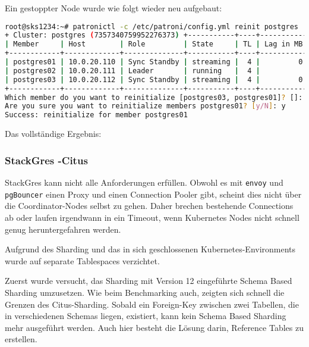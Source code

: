 \begin{flushleft}
\begin{lstlisting}[language=bash, caption=Patroni - Testing - Switchover,captionpos=b,label={lst:testing_patroni_switchover},breaklines=true]
\end{lstlisting}
    Ein gestoppter Node wurde wie folgt wieder neu aufgebaut:
\lstset{style=gra_codestyle}
\begin{lstlisting}[language=bash, caption=Patroni - Testing - Reinit,captionpos=b,label={lst:testing_patroni_reinit},breaklines=true]
root@sks1234:~# patronictl -c /etc/patroni/config.yml reinit postgres
+ Cluster: postgres (7357340759952276373) +-----------+----+-----------+
| Member     | Host        | Role         | State     | TL | Lag in MB |
+------------+-------------+--------------+-----------+----+-----------+
| postgres01 | 10.0.20.110 | Sync Standby | streaming |  4 |         0 |
| postgres02 | 10.0.20.111 | Leader       | running   |  4 |           |
| postgres03 | 10.0.20.112 | Sync Standby | streaming |  4 |         0 |
+------------+-------------+--------------+-----------+----+-----------+
Which member do you want to reinitialize [postgres03, postgres01]? []: postgres01
Are you sure you want to reinitialize members postgres01? [y/N]: y
Success: reinitialize for member postgres01
\end{lstlisting}
\end{flushleft}
\clearpage
{}
\recalctypearea
\begin{flushleft}
    Das vollständige Ergebnis:
    
\end{flushleft}
\clearpage
{}
\recalctypearea
\begin{flushleft}
    \subsubsection{StackGres -Citus}
    StackGres kann nicht alle Anforderungen erfüllen.
    Obwohl es mit \texttt{envoy} und \texttt{pgBouncer} einen Proxy und einen \Gls{Connection Pooler} gibt,
    scheint dies nicht über die Coordinator-Nodes selbst zu gehen.
    Daher brechen bestehende Connections ab oder laufen irgendwann in ein Timeout, wenn \Gls{Kubernetes} Nodes nicht schnell genug heruntergefahren werden.
\end{flushleft}
\begin{flushleft}
    Aufgrund des Sharding und das in sich geschlossenen \Gls{Kubernetes}-Environments wurde auf separate Tablespaces verzichtet.
\end{flushleft}
\begin{flushleft}
    Zuerst wurde versucht, das Sharding mit Version 12 eingeführte Schema Based Sharding umzusetzen.
    Wie beim Benchmarking auch, zeigten sich schnell die Grenzen des Citus-Sharding.
    Sobald ein Foreign-Key zwischen zwei Tabellen, die in verschiedenen Schemas liegen, existiert, kann kein Schema Based Sharding mehr ausgeführt werden.
    Auch hier besteht die Lösung darin, Reference Tables zu erstellen.
\end{flushleft}
